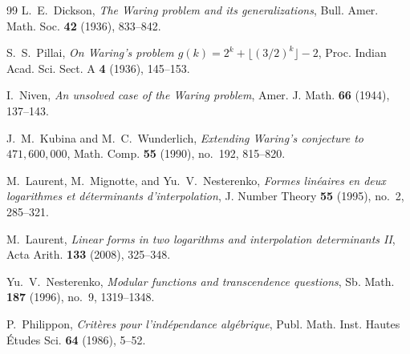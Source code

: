 \documentclass[11pt,reqno]{amsart}
\theoremstyle{definition}
\numberwithin{equation}{section}
\begin{document}
\begin{thebibliography}{99}
L.~E.~Dickson, \emph{The Waring problem and its generalizations}, Bull. Amer. Math. Soc. \textbf{42} (1936), 833--842.

S.~S.~Pillai, \emph{On Waring's problem $g(k) = 2^k + \lfloor (3/2)^k \rfloor - 2$}, Proc. Indian Acad. Sci. Sect. A \textbf{4} (1936), 145--153.

I.~Niven, \emph{An unsolved case of the Waring problem}, Amer. J. Math. \textbf{66} (1944), 137--143.

J.~M.~Kubina and M.~C.~Wunderlich, \emph{Extending Waring's conjecture to $471,600,000$}, Math. Comp. \textbf{55} (1990), no.~192, 815--820.

M.~Laurent, M.~Mignotte, and Yu.~V.~Nesterenko, \emph{Formes lin\'eaires en deux logarithmes et d\'eterminants d'interpolation}, J. Number Theory \textbf{55} (1995), no.~2, 285--321.

M.~Laurent, \emph{Linear forms in two logarithms and interpolation determinants II}, Acta Arith. \textbf{133} (2008), 325--348.

Yu.~V.~Nesterenko, \emph{Modular functions and transcendence questions}, Sb. Math. \textbf{187} (1996), no.~9, 1319--1348.

P.~Philippon, \emph{Crit\`eres pour l'ind\'ependance alg\'ebrique}, Publ. Math. Inst. Hautes \'Etudes Sci. \textbf{64} (1986), 5--52.
\end{thebibliography}
\end{document}
